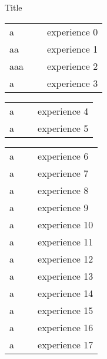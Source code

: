 \documentclass{class}
\newenvironment{packed_tabular}{
   \setlength{\tabcolsep}{0pt}
}
\newenvironment{absolutelynopagebreak}{
  \par\nobreak\vfil\penalty0\vfilneg
  \vtop\bgroup
}{\par\xdef\tpd{\the\prevdepth}\egroup\prevdepth=\tpd}
\begin{document}
   \begin{absolutelynopagebreak}
      Title
      \vspace{15pt}
   
      \begin{packed_tabular}
         \begin{tabular}{|l|c|l|}
             a   & ~ & experience 0 \\
             aa  & ~ & experience 1 \\
             aaa & ~ & experience 2 \\
             a   & ~ & experience 3 \\
         \end{tabular}%
      \end{packed_tabular}%
   \end{absolutelynopagebreak}%
%
   \begin{absolutelynopagebreak}
      \begin{packed_tabular}%
         \begin{tabular}{|l|c|l|}%
             a & ~ & experience 4 \\
             a & ~ & experience 5 \\
         \end{tabular}%
      \end{packed_tabular}%
   \end{absolutelynopagebreak}%
%
   \begin{absolutelynopagebreak}%
      \begin{packed_tabular}%
         \begin{tabular}{|l|c|l|}%
             a & ~ & experience 6 \\
             a & ~ & experience 7 \\
             a & ~ & experience 8 \\
             a & ~ & experience 9 \\
             a & ~ & experience 10 \\
             a & ~ & experience 11 \\
             a & ~ & experience 12 \\
             a & ~ & experience 13 \\
             a & ~ & experience 14 \\
             a & ~ & experience 15 \\
             a & ~ & experience 16 \\
             a & ~ & experience 17 \\
         \end{tabular}%
      \end{packed_tabular}%
   \end{absolutelynopagebreak}%
\end{document}
